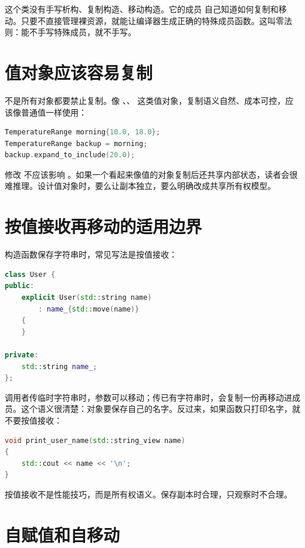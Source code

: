 这个类没有手写析构、复制构造、移动构造。它的成员  自己知道如何复制和移动。只要不直接管理裸资源，就能让编译器生成正确的特殊成员函数。这叫零法则：能不手写特殊成员，就不手写。

\section{值对象应该容易复制}

不是所有对象都要禁止复制。像 、、 这类值对象，复制语义自然、成本可控，应该像普通值一样使用：

\begin{lstlisting}[language=C++,caption={值对象可以自然复制}]
TemperatureRange morning{10.0, 18.0};
TemperatureRange backup = morning;
backup.expand_to_include(20.0);
\end{lstlisting}

修改  不应该影响 。如果一个看起来像值的对象复制后还共享内部状态，读者会很难推理。设计值对象时，要么让副本独立，要么明确改成共享所有权模型。

\section{按值接收再移动的适用边界}

构造函数保存字符串时，常见写法是按值接收：

\begin{lstlisting}[language=C++,caption={按值接收适合保存副本}]
class User {
public:
    explicit User(std::string name)
        : name_{std::move(name)}
    {
    }

private:
    std::string name_;
};
\end{lstlisting}

调用者传临时字符串时，参数可以移动；传已有字符串时，会复制一份再移动进成员。这个语义很清楚：对象要保存自己的名字。反过来，如果函数只打印名字，就不要按值接收：

\begin{lstlisting}[language=C++,caption={只观察时用字符串视图}]
void print_user_name(std::string_view name)
{
    std::cout << name << '\n';
}
\end{lstlisting}

按值接收不是性能技巧，而是所有权语义。保存副本时合理，只观察时不合理。

\section{自赋值和自移动}

